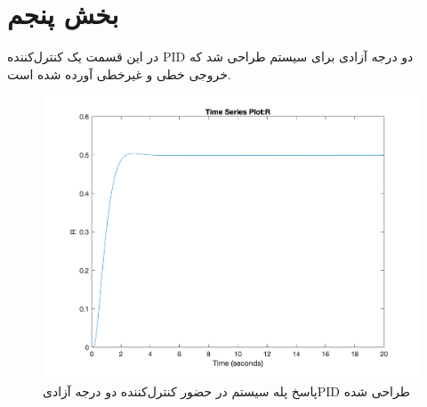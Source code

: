 \chapter{بخش پنجم}
در این قسمت یک کنترل‌کننده PID دو درجه آزادی برای سیستم طراحی شد که خروجی خطی و غیرخطی آورده شده است.
\begin{figure}[H]
	\centering
	\includegraphics[width=12cm]{../Figure/P_V/PID2DOF.png}
	\caption{پاسخ پله سیستم در حضور کنترل‌کننده دو درجه آزادیPID طراحی شده }
\end{figure}